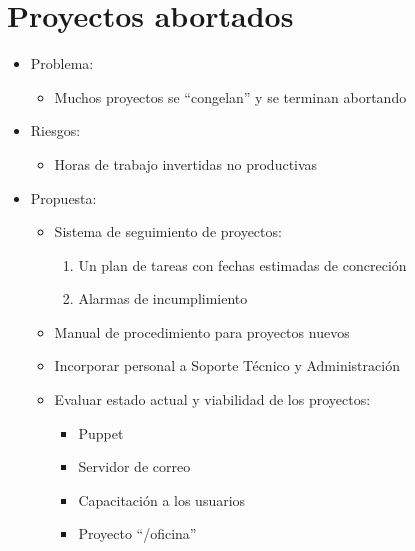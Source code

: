 \documentclass[spanish]{beamer}
\begin{document}
\section{Proyectos abortados}
\begin{frame}
  \begin{itemize}
  \item Problema:
    \begin{itemize}
    \item Muchos proyectos se ``congelan'' y se terminan abortando
    \end{itemize}
  \item Riesgos:
    \begin{itemize}
    \item Horas de trabajo invertidas no productivas
    \end{itemize}
  \item Propuesta:
    \begin{itemize}
    \item Sistema de seguimiento de proyectos:
      \begin{enumerate}
      \item Un plan de tareas con fechas estimadas de concreción
      \item Alarmas de incumplimiento
      \end{enumerate}
    \item Manual de procedimiento para proyectos nuevos
    \item Incorporar personal a Soporte Técnico y Administración
    \item Evaluar estado actual y viabilidad de los proyectos:
      \begin{itemize}
      \item Puppet
      \item Servidor de correo
      \item Capacitación a los usuarios
      \item Proyecto ``/oficina''
      \end{itemize}
    \end{itemize}
  \end{itemize}
\end{frame}
\end{document}

